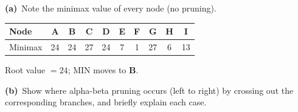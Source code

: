 \documentclass[11pt,a4paper]{article}
\newcommand{\subq}[1]{\par\smallskip\noindent\textbf{#1}\ }
\begin{document}
\subq{(a)}Note the minimax value of every node (no pruning).
\begin{solbox}
\begin{center}\small \begin{tabular}{|l|c|c|c|c|c|c|c|c|c|}\hline
\textbf{Node} & \textbf{A} & \textbf{B} & \textbf{C} & \textbf{D} & \textbf{E} & \textbf{F} & \textbf{G} & \textbf{H} & \textbf{I}\\ \hline
Minimax & \textcolor{blue!60!black}{24} & \textcolor{blue!60!black}{24} & \textcolor{blue!60!black}{27} & \textcolor{blue!60!black}{24} & \textcolor{blue!60!black}{7} & \textcolor{blue!60!black}{1} & \textcolor{blue!60!black}{27} & \textcolor{blue!60!black}{6} & \textcolor{blue!60!black}{13}\\[1.5mm] \hline
\end{tabular}\end{center}Root value $=24$; MIN moves to \textbf{B}.
\end{solbox}
\subq{(b)}Show where alpha-beta pruning occurs (left to right) by crossing out the corresponding branches, and briefly explain each case.
\end{document}
